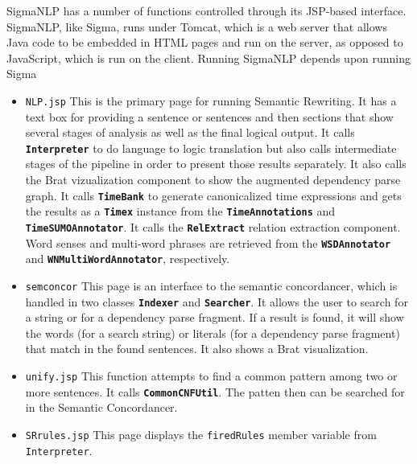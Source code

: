 \documentclass{book}
\newcommand{\tsumo}[1]{{\small \textbf{\texttt{#1}}}}
\begin{document}
SigmaNLP has a number of functions controlled through its JSP-based interface.
SigmaNLP, like Sigma, runs under Tomcat, which is a web server that allows Java
code to be embedded in HTML pages and run on the server, as opposed to
JavaScript, which is run on the client.  Running SigmaNLP depends upon running
Sigma

\begin{itemize}

\item \texttt{NLP.jsp} This is the primary page for running Semantic Rewriting.
It has a text box for providing a sentence or sentences and then sections that
show several stages of analysis as well as the final logical output.  It calls
\tsumo{Interpreter} to do language to logic
translation but also calls intermediate stages of the pipeline in order to
present those results separately.  It also calls the Brat vizualization
component to show the augmented dependency parse graph.  It calls
\tsumo{TimeBank} to generate canonicalized time
expressions and gets the results as a \tsumo{Timex}
instance from the \tsumo{TimeAnnotations} and
\tsumo{TimeSUMOAnnotator}. It calls the
\tsumo{RelExtract} relation extraction component.
Word senses and multi-word phrases are retrieved from the
\tsumo{WSDAnnotator} and
\tsumo{WNMultiWordAnnotator}, respectively.

\item \texttt{semconcor} This page is an interface to the semantic concordancer,
which is handled in two classes \tsumo{Indexer} and
\tsumo{Searcher}.  It allows the user to search for a
string or for a dependency parse fragment.  If a result is found, it will show
the words (for a search string) or literals (for a dependency parse fragment)
that match in the found sentences.  It also shows a Brat visualization.

\item \texttt{unify.jsp} This function attempts to find a common pattern among
two or more sentences.  It calls
\tsumo{CommonCNFUtil}.  The patten then can be
searched for in the Semantic Concordancer.

\item \texttt{SRrules.jsp} This page displays the \texttt{firedRules} member
variable from \texttt{Interpreter}.

\end{itemize}
\end{document}
